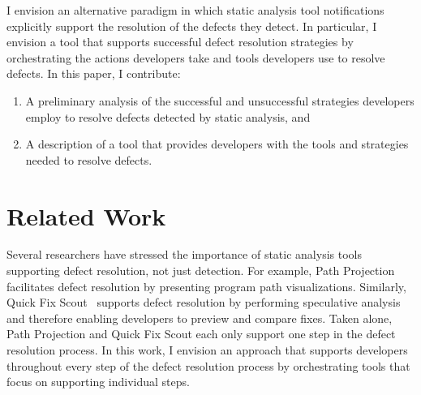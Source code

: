 \documentclass{sig-alternate}
\newcommand{\compresslist}{
	\vspace{-.5em}
	\setlength{\itemsep}{1pt}
	\setlength{\parskip}{0pt}
	\setlength{\parsep}{0pt}
}
\begin{document}
I envision an alternative paradigm in which static analysis tool notifications explicitly support the resolution of the defects they detect. 
In particular, I envision a tool that supports successful defect resolution strategies by orchestrating the actions developers take and tools developers use to resolve defects.
In this paper, I contribute: 
\begin{enumerate}
	\compresslist
	\item A preliminary analysis of the successful and unsuccessful strategies developers employ to resolve defects detected by static analysis, and
	\item A description of a tool that provides developers with the tools and strategies needed to resolve defects.
	
\end{enumerate}


\section{Related Work}
\label{sec:rw}
Several researchers have stressed the importance of static analysis tools supporting defect resolution, not just detection.
For example, Path Projection~\cite{Khoo2008} facilitates defect resolution by presenting program path visualizations. 
Similarly, Quick Fix Scout~\cite{Muslu2012} supports defect resolution by performing speculative analysis and therefore enabling developers to preview and compare fixes.
Taken alone, Path Projection and Quick Fix Scout each only support one step in the defect resolution process.
In this work, I envision an approach that supports developers throughout every step of the defect resolution process by orchestrating tools that focus on supporting individual steps.
\end{document}
